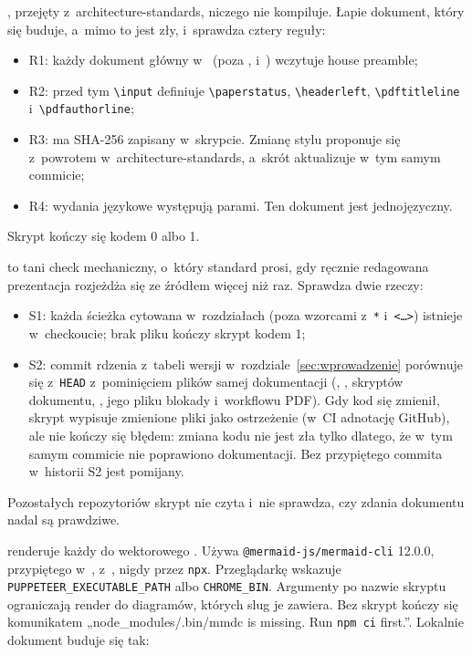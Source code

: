 , przejęty z~architecture-standards, niczego nie kompiluje.
Łapie dokument, który się buduje, a~mimo to jest zły, i~sprawdza cztery reguły:
\begin{itemize}
  \item R1: każdy dokument główny w~ (poza ,
         i~) wczytuje house preamble;
  \item R2: przed tym \texttt{\textbackslash input} definiuje \texttt{\textbackslash paperstatus},
        \texttt{\textbackslash headerleft}, \texttt{\textbackslash pdftitleline}
        i~\texttt{\textbackslash pdfauthorline};
  \item R3:  ma SHA-256 zapisany w~skrypcie. Zmianę stylu proponuje
        się z~powrotem w~architecture-standards, a~skrót aktualizuje w~tym samym commicie;
  \item R4: wydania językowe występują parami. Ten dokument jest jednojęzyczny.
\end{itemize}
Skrypt kończy się kodem 0 albo 1.

 to tani check mechaniczny, o~który standard prosi, gdy
ręcznie redagowana prezentacja rozjeżdża się ze źródłem więcej niż raz. Sprawdza dwie rzeczy:
\begin{itemize}
  \item S1: każda ścieżka  cytowana w~rozdziałach
        (poza wzorcami z~\texttt{*} i~\texttt{<…>}) istnieje w~checkoucie; brak pliku kończy
        skrypt kodem 1;
  \item S2: commit rdzenia z~tabeli wersji w~rozdziale~\ref{sec:wprowadzenie} porównuje się
        z~\texttt{HEAD} z~pominięciem plików samej dokumentacji (,
        , skryptów dokumentu, , jego pliku blokady
        i~workflowu PDF). Gdy kod się zmienił, skrypt wypisuje zmienione pliki jako
        ostrzeżenie (w~CI adnotację GitHub), ale nie kończy się błędem: zmiana kodu nie jest
        zła tylko dlatego, że w~tym samym commicie nie poprawiono dokumentacji. Bez
        przypiętego commita w~historii S2 jest pomijany.
\end{itemize}
Pozostałych repozytoriów skrypt nie czyta i~nie sprawdza, czy zdania dokumentu nadal są
prawdziwe.

 renderuje każdy  do
wektorowego . Używa \texttt{@mermaid-js/mermaid-cli}
12.0.0, przypiętego w~, z~, nigdy przez
\texttt{npx}. Przeglądarkę wskazuje \texttt{PUPPETEER\_EXECUTABLE\_PATH} albo
\texttt{CHROME\_BIN}. Argumenty po nazwie skryptu ograniczają render do diagramów, których
slug je zawiera. Bez  skrypt kończy się komunikatem
„node\_modules/.bin/mmdc is missing. Run \texttt{npm ci} first.”. Lokalnie dokument buduje
się tak:

